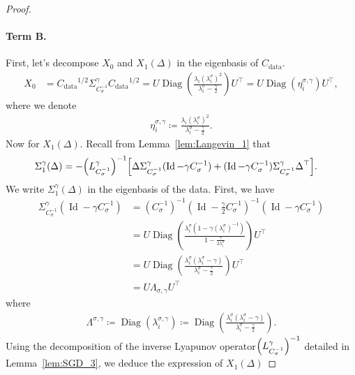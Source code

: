 \documentclass[11pt]{article}
\newcommand{\eqdef}{\coloneqq}
\newcommand{\id}{\operatorname{Id}}
\begin{document}
\begin{proof}
\paragraph{Term B.} First, let's decompose $X_0$ and $X_1(\Delta)$ in the eigenbasis of $C_\mathrm{data}$.
\begin{align*}
    X_0 &= {C_\mathrm{data}}^{1/2} \Sigma^\gamma_{C_\sigma^{-1}}{C_\mathrm{data}}^{1/2} =  U \operatorname{Diag}\left(\frac{\lambda_i (\lambda^\sigma_i)^2}{\lambda^\sigma_i - \frac{\gamma}{2}} \right) U^\top =  U \operatorname{Diag} \left(\eta^{\sigma, \gamma}_i \right) U^\top,
\end{align*}
where we denote
\begin{align*} 
\eta^{\sigma, \gamma}_i \eqdef \frac{\lambda_i (\lambda^\sigma_i)^2}{\lambda^\sigma_i - \frac{\gamma}{2}}.
\end{align*}
Now for $X_1(\Delta)$. Recall from Lemma~\ref{lem:Langevin_1} that 
\begin{align} \label{eq:sigma_1}
\Sigma_1^\gamma(\Delta) &= -\Bigl(L^\gamma_{C_\sigma^{-1}}\Bigr)^{-1}\Bigl[
\Delta \Sigma^\gamma_{{C_\sigma^{-1}}} (\id - \gamma {C_\sigma^{-1}}) + (\id - \gamma {C_\sigma^{-1}})\Sigma^\gamma_{{C_\sigma^{-1}}} \Delta^\top
\Bigr].
\end{align}
We write $\Sigma_1^\gamma(\Delta)$ in the eigenbasis of the data. First, we have
\begin{align*}
\Sigma^\gamma_{{C_\sigma^{-1}}}(\id - \gamma {C_\sigma^{-1}}) &= ({{C_\sigma^{-1}}})^{-1}\left(\id - \frac{\gamma}{2} {{C_\sigma^{-1}}}\right)^{-1} (\id - \gamma {C_\sigma^{-1}}) \\ &= U \operatorname{Diag} \left( \frac{\lambda^\sigma_i (1 - \gamma (\lambda^\sigma_i)^{-1})}{1 - \frac{\gamma}{2 \lambda^\sigma_i}}\right) U^\top \\
&= U \operatorname{Diag} \left( \frac{\lambda^\sigma_i (\lambda^\sigma_i - \gamma)}{\lambda^\sigma_i - \frac{\gamma}{2}}\right) U^\top \\
&= U \Lambda_{\sigma,\gamma} U^\top
\end{align*}
where 
\begin{align} \label{eq:l_s_g_i}
\Lambda^{\sigma,\gamma} \eqdef \operatorname{Diag}(\lambda^{\sigma,\gamma}_i) \eqdef \operatorname{Diag} \left( \frac{\lambda^\sigma_i (\lambda^\sigma_i - \gamma)}{\lambda^\sigma_i - \frac{\gamma}{2}}\right).
\end{align}
Using the decomposition of the inverse Lyapunov operator$\Bigl(L^\gamma_{C_\sigma^{-1}}\Bigr)^{-1}$ detailed in Lemma~\ref{lem:SGD_3}, we deduce the expression of $X_1(\Delta)$

\end{proof}
\end{document}
